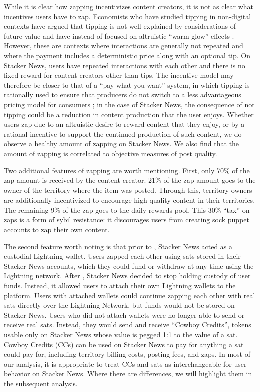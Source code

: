 While it is clear how zapping incentivizes content creators, it is not as clear what incentives users have to zap. Economists who have studied tipping in non-digital contexts have argued that tipping is not well explained by considerations of future value \citep{azar2020tipping} and have instead of focused on altruistic ``warm glow'' effects \citep{andreoni1990warmglow, crumpler2008warmglow}. However, these are contexts where interactions are generally not repeated and where the payment includes a deterministic price along with an optional tip. On Stacker News, users have repeated interactions with each other and there is no fixed reward for content creators other than tips. The incentive model may therefore be closer to that of a ``pay-what-you-want'' system, in which tipping is rationally used to ensure that producers do not switch to a less advantageous pricing model for consumers \citep{mak2015pay}; in the case of Stacker News, the consequence of not tipping could be a reduction in content production that the user enjoys. Whether users zap due to an altruistic desire to reward content that they enjoy, or by a rational incentive to support the continued production of such content, we do observe a healthy amount of zapping on Stacker News. We also find that the amount of zapping is correlated to objective measures of post quality.

Two additional features of zapping are worth mentioning. First, only 70\% of the zap amount is received by the content creator. 21\% of the zap amount goes to the owner of the territory where the item was posted. Through this, territory owners are additionally incentivized to encourage high quality content in their territories. The remaining 9\% of the zap goes to the daily rewards pool. This 30\% ``tax'' on zaps is a form of sybil resistance: it discourages users from creating sock puppet accounts to zap their own content.

The second feature worth noting is that prior to , Stacker News acted as a custodial Lightning wallet. Users zapped each other using sats stored in their Stacker News accounts, which they could fund or withdraw at any time using the Lightning network. After , Stacker News decided to stop holding custody of user funds. Instead, it allowed users to attach their own Lightning wallets to the platform. Users with attached wallets could continue zapping each other with real sats directly over the Lightning Network, but funds would not be stored on Stacker News. Users who did not attach wallets were no longer able to send or receive real sats. Instead, they would send and receive ``Cowboy Credits'', tokens usable only on Stacker News whose value is pegged 1:1 to the value of a sat. Cowboy Credits (CCs) can be used on Stacker News to pay for anything a sat could pay for, including territory billing costs, posting fees, and zaps. In most of our analysis, it is appropriate to treat CCs and sats as interchangeable for user behavior on Stacker News. Where there are differences, we will highlight them in the subsequent analysis.

